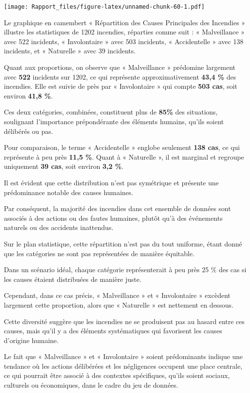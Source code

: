 \documentclass[
]{article}
\begin{document}
\texttt{[image: Rapport\_files/figure-latex/unnamed-chunk-60-1.pdf]}

Le graphique en camembert « Répartition des Causes Principales des
Incendies » illustre les statistiques de 1202 incendies, réparties comme
suit : « Malveillance » avec 522 incidents, « Involontaire » avec 503
incidents, « Accidentelle » avec 138 incidents, et « Naturelle » avec 39
incidents.

Quant aux proportions, on observe que « Malveillance » prédomine
largement avec \textbf{522} incidents sur 1202, ce qui représente
approximativement \textbf{43,4 \%} des incendies. Elle est suivie de
près par « Involontaire » qui compte \textbf{503 cas}, soit environ
\textbf{41,8 \%}.

Ces deux catégories, combinées, constituent plus de \textbf{85\%} des
situations, soulignant l'importance prépondérante des éléments humains,
qu'ils soient délibérés ou pas.

Pour comparaison, le terme « Accidentelle » englobe seulement
\textbf{138 cas}, ce qui représente à peu près \textbf{11,5 \%}. Quant à
« Naturelle », il est marginal et regroupe uniquement \textbf{39 cas},
soit environ \textbf{3,2 \%}.

Il est évident que cette distribution n'est pas symétrique et présente
une prédominance notable des causes humaines.

Par conséquent, la majorité des incendies dans cet ensemble de données
sont associés à des actions ou des fautes humaines, plutôt qu'à des
événements naturels ou des accidents inattendus.

Sur le plan statistique, cette répartition n'est pas du tout uniforme,
étant donné que les catégories ne sont pas représentées de manière
équitable.

Dans un scénario idéal, chaque catégorie représenterait à peu près 25 \%
des cas si les causes étaient distribuées de manière juste.

Cependant, dans ce cas précis, « Malveillance » et « Involontaire »
excèdent largement cette proportion, alors que « Naturelle » est
nettement en dessous.

Cette diversité suggère que les incendies ne se produisent pas au hasard
entre ces causes, mais qu'il y a des éléments systématiques qui
favorisent les causes d'origine humaine.

Le fait que « Malveillance » et « Involontaire » soient prédominants
indique une tendance où les actions délibérées et les négligences
occupent une place centrale, ce qui pourrait être associé à des
contextes spécifiques, qu'ils soient sociaux, culturels ou économiques,
dans le cadre du jeu de données.
\end{document}
